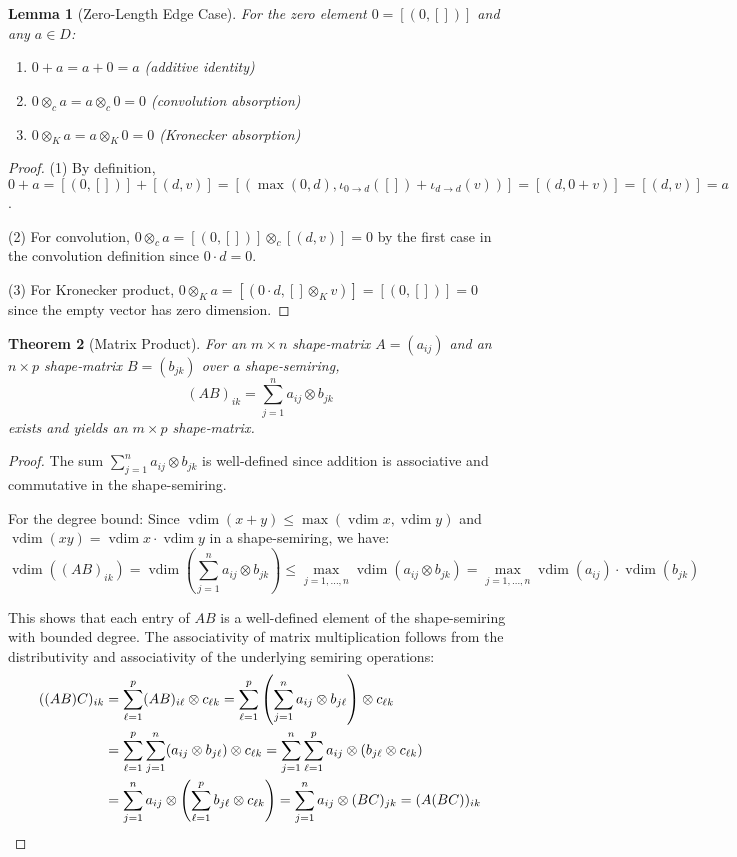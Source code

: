 \documentclass[11pt]{article}
\newtheorem{theorem}{Theorem}[section]
\newtheorem{lemma}[theorem]{Lemma}
\newcommand{\vdim}{\operatorname{vdim}}
\begin{document}
\begin{lemma}[Zero-Length Edge Case]\label{lem:zeroLength}
For the zero element $0 = [(0,[])]$ and any $a \in D$:
\begin{enumerate}[leftmargin=2em]
\item $0 + a = a + 0 = a$ (additive identity)
\item $0 \otimes_c a = a \otimes_c 0 = 0$ (convolution absorption)  
\item $0 \otimes_K a = a \otimes_K 0 = 0$ (Kronecker absorption)
\end{enumerate}
\end{lemma}
\begin{proof}
(1) By definition, $0 + a = [(0,[])] + [(d,v)] = [(\max(0,d), \iota_{0 \to d}([]) + \iota_{d \to d}(v))] = [(d, 0 + v)] = [(d,v)] = a$.

(2) For convolution, $0 \otimes_c a = [(0,[])] \otimes_c [(d,v)] = 0$ by the first case in the convolution definition since $0 \cdot d = 0$.

(3) For Kronecker product, $0 \otimes_K a = [(0 \cdot d, [] \otimes_K v)] = [(0,[])] = 0$ since the empty vector has zero dimension.
\end{proof}

\begin{theorem}[Matrix Product]
For an $m\times n$ shape‑matrix $A=(a_{ij})$ and an $n\times p$ shape‑matrix $B=(b_{jk})$ over a shape‑semiring,
\[(AB)_{ik}=\sum_{j=1}^{n} a_{ij}\otimes b_{jk}\] exists and yields an $m\times p$ shape‑matrix.
\end{theorem}
\begin{proof}
The sum $\sum_{j=1}^{n} a_{ij}\otimes b_{jk}$ is well-defined since addition is associative and commutative in the shape-semiring. 

For the degree bound: Since $\vdim(x+y) \leq \max(\vdim x, \vdim y)$ and $\vdim(xy) = \vdim x \cdot \vdim y$ in a shape-semiring, we have:
\[\vdim((AB)_{ik}) = \vdim\left(\sum_{j=1}^{n} a_{ij}\otimes b_{jk}\right) \leq \max_{j=1,\ldots,n} \vdim(a_{ij}\otimes b_{jk}) = \max_{j=1,\ldots,n} \vdim(a_{ij}) \cdot \vdim(b_{jk})\]

This shows that each entry of $AB$ is a well-defined element of the shape-semiring with bounded degree. The associativity of matrix multiplication follows from the distributivity and associativity of the underlying semiring operations:
\begin{align}
((AB)C)_{ik} &= \sum_{\ell=1}^{p} (AB)_{i\ell} \otimes c_{\ell k} = \sum_{\ell=1}^{p} \left(\sum_{j=1}^{n} a_{ij} \otimes b_{j\ell}\right) \otimes c_{\ell k} \\
&= \sum_{\ell=1}^{p} \sum_{j=1}^{n} (a_{ij} \otimes b_{j\ell}) \otimes c_{\ell k} = \sum_{j=1}^{n} \sum_{\ell=1}^{p} a_{ij} \otimes (b_{j\ell} \otimes c_{\ell k}) \\
&= \sum_{j=1}^{n} a_{ij} \otimes \left(\sum_{\ell=1}^{p} b_{j\ell} \otimes c_{\ell k}\right) = \sum_{j=1}^{n} a_{ij} \otimes (BC)_{jk} = (A(BC))_{ik}\qedhere
\end{align}
\end{proof}
\end{document}
